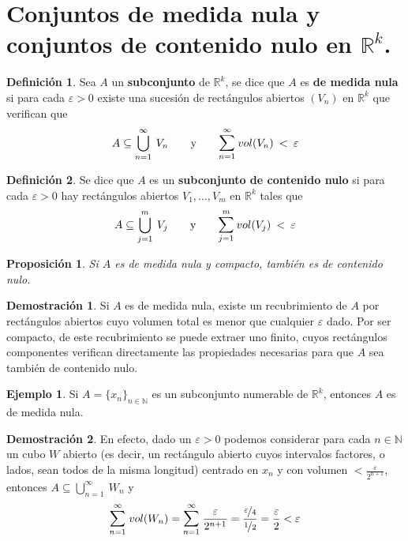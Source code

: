 \documentclass[12pt,twoside]{report}
\theoremstyle{azul}
\theoremstyle{azul2}
\theoremstyle{plain}
\newtheorem{pro}{Proposición}[chapter]
\theoremstyle{definition}
\newtheorem{eje}{Ejemplo}[chapter]
\newtheorem{defin}{Definición}[chapter]
\newtheorem*{dem}{Demostración}
\theoremstyle{remark}
\begin{document}
\section{Conjuntos de medida nula y conjuntos de contenido nulo en $\mathbb{R}^k$.}
\begin{defin}
Sea $A$ un \textbf{subconjunto} de $\mathbb{R}^k$, se dice que $A$ es \textbf{de medida nula} si para cada $\varepsilon > 0$ existe una sucesión de rectángulos abiertos $(V_n)$ en $\mathbb{R}^k$ que verifican que 
$$A \subseteq \bigcup_{n=1}^{\infty} \: V_n \qquad \text{y} \qquad \mathlarger{\sum}_{n=1}^{\infty} \: vol(V_n) \: < \: \varepsilon$$
\end{defin}
\begin{defin}
Se dice que $A$ es un \textbf{subconjunto de contenido nulo} si para cada $\varepsilon > 0$ hay rectángulos abiertos $V_1, \ldots, V_m$ en $\mathbb{R}^k$ tales que $$A \subseteq \bigcup_{j=1}^{m} \: V_j \qquad \text{y} \qquad \mathlarger{\sum}_{j=1}^{m} \: vol(V_j) \: < \: \varepsilon$$
\end{defin}

\begin{pro}
Si $A$ es de medida nula y compacto, también es de contenido nulo.
\end{pro}
\begin{dem}
Si $A$ es de medida nula, existe un recubrimiento de $A$ por rectángulos abiertos cuyo volumen total es menor que cualquier $\varepsilon$ dado. Por ser compacto, de este recubrimiento se puede extraer uno finito, cuyos rectángulos componentes verifican directamente las propiedades necesarias para que $A$ sea también de contenido nulo.
\end{dem}

\begin{eje}
Si $A=\{x_n\}_{n \in \mathbb{N}}$ es un subconjunto numerable de $\mathbb{R}^k$, entonces $A$ es de medida nula.
\begin{dem}
En efecto, dado un $\varepsilon > 0$ podemos considerar para cada $n \in \mathbb{N}$ un cubo $W$ abierto (es decir, un rectángulo abierto cuyos intervalos factores, o lados, sean todos de la misma longitud) centrado en $x_n$ y con volumen $< \frac{\varepsilon}{2^{n+1}}$, entonces $A \subseteq \bigcup_{n=1}^{\infty} \: W_n$ y $$\mathlarger{\sum}_{n=1}^{\infty} \; vol(W_n) = \mathlarger{\sum}_{n=1}^{\infty}\; \dfrac{\varepsilon}{2^{n+1}} = \dfrac{\nicefrac{\varepsilon}{4}}{\nicefrac{1}{2}} = \dfrac{\varepsilon}{2} < \varepsilon$$
\end{dem}
\end{eje} 
\end{document}
